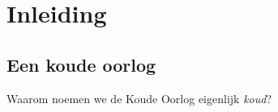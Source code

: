 \chapter{Inleiding}
\section{Een koude oorlog}

Waarom noemen we de Koude Oorlog eigenlijk \emph{koud}?
